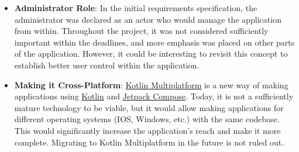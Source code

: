 \begin{itemize}
    \item \textbf{Administrator Role}: In the initial requirements specification, the administrator was declared as an actor who would manage the application from within. Throughout the project, it was not considered sufficiently important within the deadlines, and more emphasis was placed on other parts of the application. However, it could be interesting to revisit this concept to establish better user control within the application.
    \item \textbf{Making it Cross-Platform}: \href{https://kotlinlang.org/docs/multiplatform.html}{Kotlin Multiplatform} is a new way of making applications using \hyperlink{subsec:kotlin}{Kotlin} and \hyperlink{subsec:compose}{Jetpack Compose}. Today, it is not a sufficiently mature technology to be viable, but it would allow making applications for different operating systems (IOS, Windows, etc.) with the same codebase. This would significantly increase the application's reach and make it more complete. Migrating to Kotlin Multiplatform in the future is not ruled out.
\end{itemize}